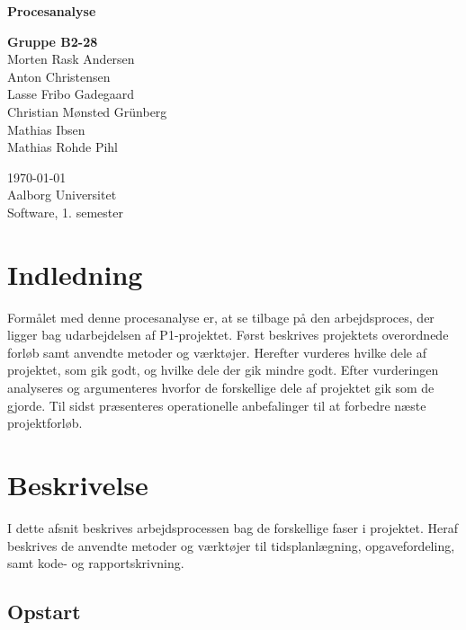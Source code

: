 \documentclass[oneside,a4paper,titlepage]{article}
\begin{document}
\begin{titlepage}
  \vspace{0.2cm}
  \begin{center}
    \Huge{\textbf{Procesanalyse}}
  \end{center}
  \vspace{0.2cm}
  \begin{center}
    \Large{\textbf{Gruppe B2-28}}\\
    Morten Rask Andersen\\
    Anton Christensen\\
    Lasse Fribo Gadegaard\\
    Christian Mønsted Grünberg\\
    Mathias Ibsen\\
    Mathias Rohde Pihl
  \end{center}
  \begin{center}
    \today\\
    Aalborg Universitet\\
    Software, 1. semester
  \end{center}
\end{titlepage}





\section{Indledning}

Formålet med denne procesanalyse er, at se tilbage på den arbejdsproces, der ligger bag udarbejdelsen af P1-projektet. Først beskrives projektets overordnede forløb samt anvendte metoder og værktøjer. Herefter vurderes hvilke dele af projektet, som gik godt, og hvilke dele der gik mindre godt. Efter vurderingen analyseres og argumenteres hvorfor de forskellige dele af projektet gik som de gjorde. Til sidst præsenteres operationelle anbefalinger til at forbedre næste projektforløb. 

\section{Beskrivelse}
\label{sec:beskrivelse}
I dette afsnit beskrives arbejdsprocessen bag de forskellige faser i projektet. Heraf beskrives de anvendte metoder og værktøjer til tidsplanlægning, opgavefordeling, samt kode- og rapportskrivning.

\subsection{Opstart}
\end{document}
